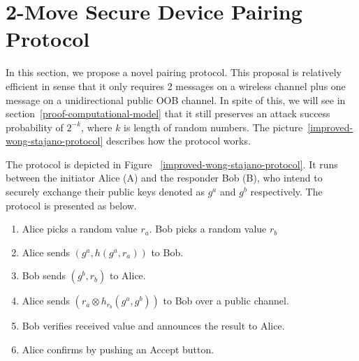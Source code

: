 \section{2-Move Secure Device Pairing Protocol}\label{chap42move}

In this section, we propose a novel pairing protocol. This proposal is relatively efficient in sense that it only requires 2 messages on a wireless channel plus one message on a unidirectional public OOB channel. In spite of this, we will see in section~\ref{proof-computational-model} that it still preserves an attack success probability of $2^{-k}$, where $k$ is length of random numbers. The picture~\ref{improved-wong-stajano-protocol} describes how the protocol works. 

The protocol is depicted in Figure ~\ref{improved-wong-stajano-protocol}. It runs between the initiator Alice (A) and the responder Bob (B), who intend to securely exchange their public keys denoted as $g^a$ and $g^b$ respectively. The protocol is presented as below.

\begin{enumerate}
\item Alice picks a random value $r_a$. Bob picks a random value $r_b$
\item Alice sends $(g^a,h(g^a,r_a))$ to Bob.
\item Bob sends $(g^b,r_b)$ to Alice.
\item Alice sends $(r_a \otimes h_{r_b}(g^a,g^b) )$ to Bob over a public channel. 
\item Bob verifies received value and announces the result to Alice. 
\item Alice confirms by pushing an Accept button. 
\end{enumerate}

